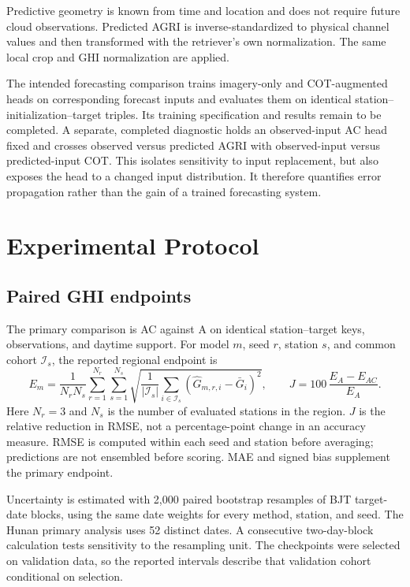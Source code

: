 \documentclass[11pt]{article}
\begin{document}
Predictive geometry is known from time and location and does not require future cloud observations. Predicted AGRI is inverse-standardized to physical channel values and then transformed with the retriever's own normalization. The same local crop and GHI normalization are applied.

The intended forecasting comparison trains imagery-only and COT-augmented heads on corresponding forecast inputs and evaluates them on identical station--initialization--target triples. Its training specification and results remain to be completed. A separate, completed diagnostic holds an observed-input AC head fixed and crosses observed versus predicted AGRI with observed-input versus predicted-input COT. This isolates sensitivity to input replacement, but also exposes the head to a changed input distribution. It therefore quantifies error propagation rather than the gain of a trained forecasting system.
\section{Experimental Protocol}
\subsection{Paired GHI endpoints}
The primary comparison is AC against A on identical station--target keys, observations, and daytime support. For model $m$, seed $r$, station $s$, and common cohort $\mathcal I_s$, the reported regional endpoint is
\begin{equation}
E_m=\frac{1}{N_rN_s}\sum_{r=1}^{N_r}\sum_{s=1}^{N_s}
\sqrt{\frac{1}{|\mathcal I_s|}\sum_{i\in\mathcal I_s}
(\widehat G_{m,r,i}-\bar G_i)^2},
\qquad
J=100\,\frac{E_A-E_{AC}}{E_A}.
\label{eq:endpoint}
\end{equation}
Here $N_r=3$ and $N_s$ is the number of evaluated stations in the region. $J$ is the relative reduction in RMSE, not a percentage-point change in an accuracy measure. RMSE is computed within each seed and station before averaging; predictions are not ensembled before scoring. MAE and signed bias supplement the primary endpoint.

Uncertainty is estimated with 2,000 paired bootstrap resamples of BJT target-date blocks, using the same date weights for every method, station, and seed. The Hunan primary analysis uses 52 distinct dates. A consecutive two-day-block calculation tests sensitivity to the resampling unit. The checkpoints were selected on validation data, so the reported intervals describe that validation cohort conditional on selection.
\end{document}
